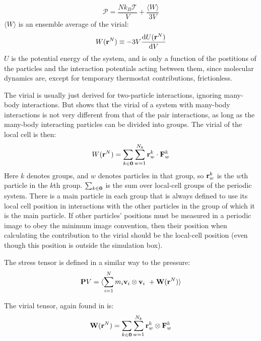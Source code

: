 \begin{equation}
	\mathcal{P} = \frac{Nk_B\mathcal{T}}{V} + \frac{\langle W \rangle}{3V}
\end{equation}
$\langle W \rangle$ is an ensemble average of the virial:
\begin{equation}
	W(\mathbf{r}^N) \equiv -3V\frac{\mathrm{d} U(\mathbf{r}^N)}{\mathrm{d} V}
\end{equation}
$U$ is the potential energy of the system, and is only a function of the postitions of the particles and the interaction potentials acting between them, since molecular dynamics are, except for temporary thermostat contributions, frictionless. 

The virial is usually just derived for two-particle interactions, ignoring many-body interactions. But \citet{Thompson2009} shows that the virial of a system with many-body interactions is not very different from that of the pair interactions, as long as the many-body interacting particles can be divided into groups. The virial of the local cell is then:
\begin{equation}
	W(\mathbf{r}^N) = \sum_{k\in\mathbf{0}}\sum_{w=1}^{N_k} \mathbf{r}^k_w \cdot \mathbf{F}^k_w
\end{equation}
Here $k$ denotes groups, and $w$ denotes particles in that group, so $\mathbf{r}^k_w$ is the $w$th particle in the $k$th group. $\sum_{k \in \mathbf{0}}$ is the sum over local-cell groups of the periodic system. There is a main particle in each group that is always defined to use its local cell position in interactions with the other particles in the group of which it is the main particle. If other particles' positions must be measured in a periodic image to obey the minimum image convention, then their position when calculating the contribution to the virial should be the local-cell position (even though this position is outside the simulation box). 

The stress tensor is defined in a similar way to the pressure:
\begin{equation}
	\mathbf{P} V = \langle \sum_{i=1}^N m_i \mathbf{v}_i \otimes \mathbf{v}_i \ + \mathbf{W}(\mathbf{r}^N)\rangle
\end{equation}

The virial tensor, again found in \citet{Thompson2009} is:
\begin{equation}
	\mathbf{W}(\mathbf{r}^N) = \sum_{k \in \mathbf{0}} \sum_{w=1}^{N_k} \mathbf{r}_w^k \otimes \mathbf{F}^k_w
\end{equation}

